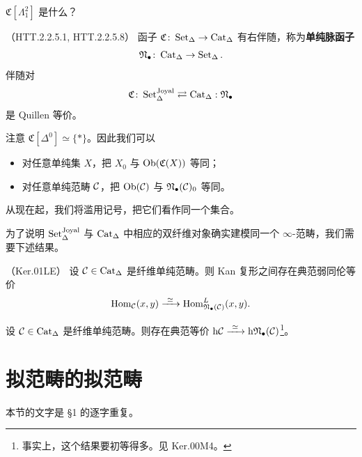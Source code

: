 \begin{exercise}\label{L5-6.7}
$\mathfrak{C}[\Lambda^2_1]$ 是什么？
\end{exercise}

\begin{theoremdef}\label{L5-6.8}（HTT.2.2.5.1, HTT.2.2.5.8）
函子 $\mathfrak{C}\colon\operatorname{Set}_\Delta\to\operatorname{Cat}_\Delta$ 有右伴随，称为\textbf{单纯脉函子}
\[
\mathfrak{N}_{\bullet}\colon\operatorname{Cat}_\Delta\to\operatorname{Set}_\Delta.
\]
伴随对
\[
\mathfrak{C}\colon\operatorname{Set}^{\mathrm{Joyal}}_\Delta\rightleftarrows\operatorname{Cat}_\Delta:\mathfrak{N}_{\bullet}
\]
是 Quillen 等价。
\end{theoremdef}


\nitem\label{L5-6.9} 注意 $\mathfrak{C}[\Delta^0]\simeq\{\ast\}$。因此我们可以
\begin{itemize}[leftmargin=2.2em,itemsep=0.1em]
\item 对任意单纯集 $X$，把 $X_0$ 与 $\operatorname{Ob}(\mathfrak{C}(X))$ 等同；
\item 对任意单纯范畴 $\mathcal{C}$，把 $\operatorname{Ob}(\mathcal{C})$ 与 $\mathfrak{N}_{\bullet}(\mathcal{C})_0$ 等同。
\end{itemize}
从现在起，我们将滥用记号，把它们看作同一个集合。

\nitem\label{L5-6.10} 为了说明 $\operatorname{Set}^{\mathrm{Joyal}}_\Delta$ 与 $\operatorname{Cat}_\Delta$ 中相应的双纤维对象确实建模同一个 $\infty$-范畴，我们需要下述结果。

\begin{theorem}\label{L5-6.11}（Ker.01LE）
设 $\mathcal{C}\in\operatorname{Cat}_\Delta$ 是纤维单纯范畴。则 Kan 复形之间存在典范弱同伦等价
\[
\Hom_{\cC}(x,y)\xrightarrow{\ \simeq\ }\Hom^{L}_{\mathfrak{N}_{\bullet}(\cC)}(x,y).
\]
\end{theorem}

\begin{corollary}\label{L5-6.12}
设 $\mathcal{C}\in\operatorname{Cat}_\Delta$ 是纤维单纯范畴。则存在典范等价 $\mathrm{h}\cC\xrightarrow{\ \simeq\ }\mathrm{h}\mathfrak{N}_{\bullet}(\cC)$\footnote{事实上，这个结果要初等得多。见 Ker.00M4。}。
\end{corollary}

\section{拟范畴的拟范畴}

\nitem\label{L5-7.1} 本节的文字是 \S1 的逐字重复。

